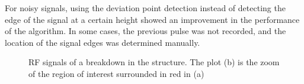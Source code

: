 For noisy signals, using the deviation point detection instead of detecting the edge of the signal at a certain height showed an improvement in the performance of the algorithm. In some cases, the previous pulse was not recorded, and the location of the signal edges was determined manually.

 \begin{figure}
\centering
   \hspace{1mm}
\caption{RF signals of a breakdown in the structure. The plot (b) is the zoom of the region of interest surrounded in red in (a)}
 \label{dev_pt}
 \end{figure}


